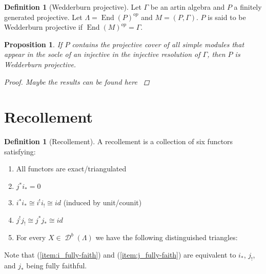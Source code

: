 \documentclass[11pt, a4paper, english]{article}
\newtheorem{prop}[theorem]{Proposition}
\theoremstyle{definition}
\newtheorem{defn}[theorem]{Definition}
\DeclareMathOperator{\End}{End}
\DeclareMathOperator{\D}{\mathcal{D}}
\begin{document}
\begin{defn}[Wedderburn projective]
	Let $\Gamma$ be an artin algebra and $P$ a finitely generated projective. Let $\Lambda = \End(P)^{op}$ and $M=(P, \Gamma)$. $P$ is said to be Wedderburn projective if $\End(M)^{op}=\Gamma$.
\end{defn}

\begin{prop}
	If $P$ contains the projective cover of all simple modules that appear in the socle of an injective in the injective resolution of $\Gamma$, then $P$ is Wedderburn projective.
	\begin{proof}
		Maybe the results can be found here \cite{Aus74}
	\end{proof}
\end{prop}

\section{Recollement}
\begin{defn}[Recollement]\label{def:recollement}
	A recollement is a collection of six functors satisfying:
\begin{center}
\end{center}

\begin{enumerate}
	\item All functors are exact/triangulated
	\item $j^*i_*=0$
	\item $i^*i_* \cong i^!i_! \cong id$ (induced by unit/counit) \label{item:i_fully-faith}
	\item $j^!j_! \cong j^*j_* \cong id$ \label{item:j_fully-faith}
	\item \label{recollement:triangles}
	For every $X \in \D^b(\Lambda)$ we have the following distinguished triangles:
	\begin{center}
	\end{center}
\end{enumerate}
Note that (\ref{item:i_fully-faith}) and (\ref{item:j_fully-faith}) are equivalent to $i_*$, $j_!$, and $j_*$ being fully faithful.
\end{defn}
\end{document}
